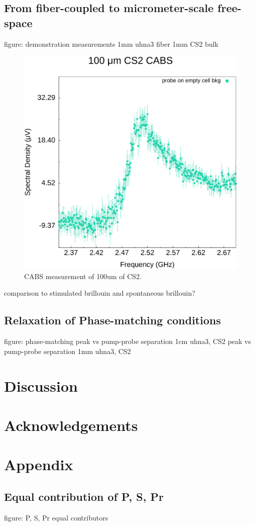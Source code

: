   \subsection{From fiber-coupled to micrometer-scale free-space}
  figure: demonstration measurements
    1mm uhna3 fiber
    1mm CS2 bulk

    \begin{figure}[t]
        \centering
        \includegraphics[width=\textwidth]{figs/4-CABS/CABS-100um CS2.png}
        \caption{CABS measurement of 100um of CS2.}
        \label{fig:CABS 100um CS2}
    \end{figure}

    comparison to stimulated brillouin and spontaneous brillouin?

  \subsection{Relaxation of Phase-matching conditions}
  figure: phase-matching
    peak vs pump-probe separation 1cm uhna3, CS2
    peak vs pump-probe separation 1mm uhna3, CS2

\section{Discussion}

\section{Acknowledgements}

\section{Appendix}
  \subsection{Equal contribution of P, S, Pr}
  figure: P, S, Pr equal contributors
